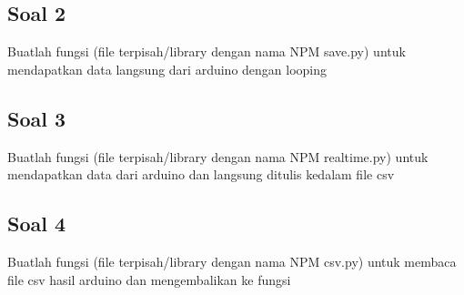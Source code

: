 \subsection{Soal 2}
Buatlah fungsi (file terpisah/library dengan nama NPM save.py) untuk mendapatkan data langsung dari arduino dengan looping



\subsection{Soal 3}
Buatlah fungsi (file terpisah/library dengan nama NPM realtime.py) untuk mendapatkan data dari arduino dan langsung ditulis kedalam file csv


\subsection{Soal 4}
Buatlah fungsi (file terpisah/library dengan nama NPM csv.py) untuk membaca file csv hasil arduino dan mengembalikan ke fungsi


